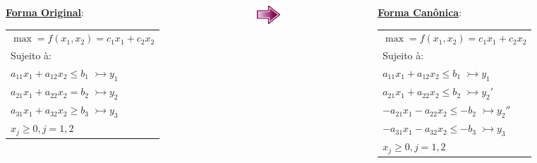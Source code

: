 \documentclass{beamer}
\begin{document}
\begin{frame}
{\begin{block}
		\end{block}	
	}
	{
		\begin{columns}
			\scriptsize
			\begin{column}{4.5cm}
				{\color{red} \Large \underline{\textbf{Forma Original}}:} \\
				\begin{table}
					\begin{tabular}{l }
						$\max = f(x_1,x_2) = c_1x_1 + c_2x_2$ \\
						Sujeito à: \\
						$a_{11}x_1 + a_{12}x_2 \le b_1 $ \color{red} $\rightarrowtail y_1$ \\
						\cellcolor{yellow!80}$a_{21}x_1 + a_{22}x_2 = b_2$    \color{red} $\rightarrowtail y_2$ \\
						$a_{31}x_1 + a_{32}x_2 \ge b_3 $ \color{red} $\rightarrowtail y_3$ \\
						$x_j \ge 0, j = 1, 2$\\
					\end{tabular}
				\end{table}
			\end{column}
			\begin{column}{1cm}
				\includegraphics[width=1cm,height=0.7cm]{seta.png}
			\end{column}
			\begin{column}{4.5cm}
				{\color{red} \Large \underline{\textbf{Forma Canônica}}:} \\
				\begin{mdframed}[backgroundcolor=cyan!60]
					\begin{table}
						\begin{tabular}{l }
							$\max = f(x_1,x_2) = c_1x_1 + c_2x_2$ \\
							Sujeito à: \\
							$a_{11}x_1 + a_{12}x_2 \le b_1 $ \color{red} $\rightarrowtail y_1$ \\
							$a_{21}x_1 + a_{22}x_2 \le b_2$    \color{red} $\rightarrowtail y_2'$ \\
							$-a_{21}x_1 - a_{22}x_2 \le -b_2$    \color{red} $\rightarrowtail y_2''$ \\
							$-a_{31}x_1 - a_{32}x_2 \le -b_3 $ \color{red} $\rightarrowtail y_3$ \\
							$x_j \ge 0, j = 1, 2$\\
						\end{tabular}
					\end{table}				
				\end{mdframed}
				
			\end{column}
		\end{columns}
	}
\end{frame}
\end{document}
